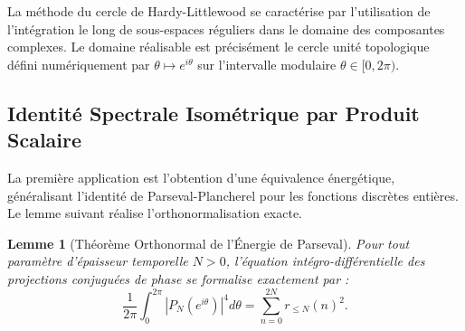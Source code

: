 \documentclass[12pt,a4paper]{article}
\newtheorem{lemma}[theorem]{Lemme}
\begin{document}
La m\'ethode du cercle de Hardy-Littlewood se caract\'erise par l'utilisation de l'int\'egration le long de sous-espaces r\'eguliers dans le domaine des composantes complexes. Le domaine r\'ealisable est pr\'ecis\'ement le cercle unit\'e topologique d\'efini num\'eriquement par $\theta \mapsto e^{i\theta}$ sur l'intervalle modulaire $\theta \in [0, 2\pi)$.

\subsection{Identit\'e Spectrale Isom\'etrique par Produit Scalaire}

La premi\`ere application est l'obtention d'une \'equivalence \'energ\'etique, g\'en\'eralisant l'identit\'e de Parseval-Plancherel pour les fonctions discr\`etes enti\`eres. Le lemme suivant r\'ealise l'orthonormalisation exacte.

\begin{lemma}[Th\'eor\`eme Orthonormal de l'\'Energie de Parseval]
\label{lem:parseval}
Pour tout param\`etre d'\'epaisseur temporelle $N > 0$, l'\'equation int\'egro-diff\'erentielle des projections conjugu\'ees de phase se formalise exactement par :
\begin{equation}
\frac{1}{2\pi} \int_0^{2\pi} |P_N(e^{i\theta})|^4 d\theta = \sum_{n=0}^{2N} r_{\le N}(n)^2.
\end{equation}
\end{lemma}
\end{document}

